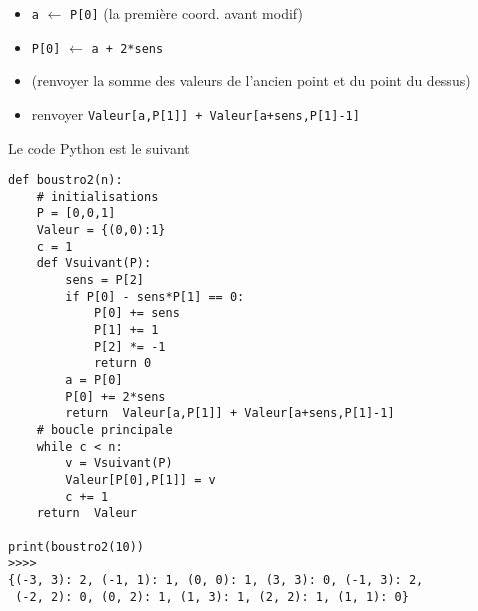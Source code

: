 \begin{enumerate}
\begin{enumerate}
\begin{itemize}
  \item \verb|a| $\longleftarrow$ \verb|P[0]| (la première coord. avant modif)
  \item \verb|P[0]| $\longleftarrow$ \verb|a + 2*sens|
  \item (renvoyer la somme des valeurs de l'ancien point et du point du dessus)
  \item renvoyer \verb|Valeur[a,P[1]] + Valeur[a+sens,P[1]-1]|
\end{itemize}
Le code Python est le suivant
\begin{verbatim}
def boustro2(n):
    # initialisations
    P = [0,0,1]
    Valeur = {(0,0):1}
    c = 1
    def Vsuivant(P):
        sens = P[2]
        if P[0] - sens*P[1] == 0:
            P[0] += sens
            P[1] += 1
            P[2] *= -1
            return 0
        a = P[0]
        P[0] += 2*sens
        return  Valeur[a,P[1]] + Valeur[a+sens,P[1]-1] 
    # boucle principale
    while c < n:
        v = Vsuivant(P)
        Valeur[P[0],P[1]] = v
        c += 1
    return  Valeur
    
print(boustro2(10))
>>>>
{(-3, 3): 2, (-1, 1): 1, (0, 0): 1, (3, 3): 0, (-1, 3): 2,
 (-2, 2): 0, (0, 2): 1, (1, 3): 1, (2, 2): 1, (1, 1): 0}
\end{verbatim}

\end{enumerate}
\end{enumerate}

